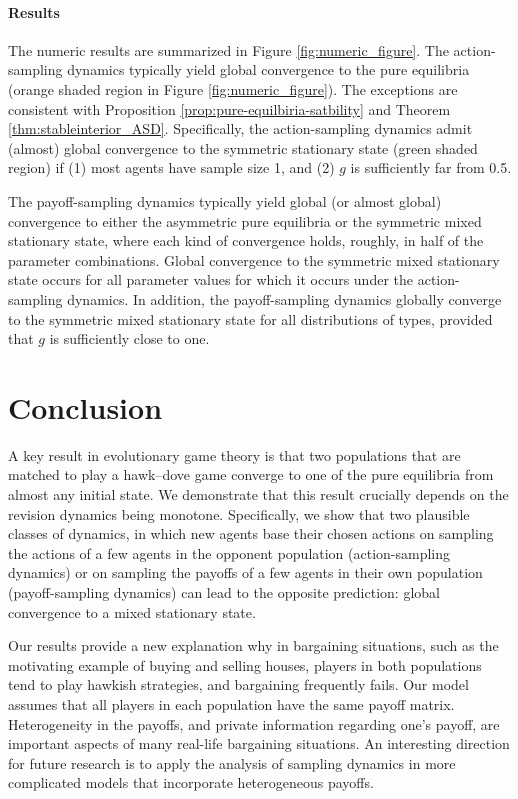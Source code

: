 \documentclass[12pt]{article}
\numberwithin{equation}{section}
\numberwithin{figure}{section}
\theoremstyle{definition}
\theoremstyle{plain}
\theoremstyle{plain}
\theoremstyle{plain}
\theoremstyle{remark}
\theoremstyle{plain}
\theoremstyle{plain}
\begin{document}
\paragraph{Results}
The numeric results are summarized in Figure
\ref{fig:numeric_figure}. 
The action-sampling dynamics typically yield global convergence to the pure equilibria  (orange shaded region in Figure
\ref{fig:numeric_figure}).  The exceptions are consistent with Proposition \ref{prop:pure-equilbiria-satbility} and Theorem \ref{thm:stableinterior_ASD}. Specifically, the action-sampling dynamics admit (almost) global convergence to the symmetric stationary state (green shaded region) if  (1) most agents have sample size 1, and (2) $g$ is sufficiently far from 0.5. 

The payoff-sampling dynamics typically yield global (or almost global) convergence to either the asymmetric pure equilibria  or the symmetric mixed stationary state, where each kind of convergence holds, roughly, in half of the parameter combinations. Global convergence to the symmetric mixed stationary state occurs for all parameter values for which it occurs under the action-sampling dynamics. In addition, the payoff-sampling dynamics globally converge to the symmetric mixed stationary state for all distributions of types, provided that $g$ is sufficiently close to one. 


\section{Conclusion}\label{sec:conclusion}
A key result in evolutionary game theory is that two populations that are matched to play a hawk--dove game converge to one of the pure equilibria from almost any initial state. We demonstrate that this result crucially depends on the revision dynamics being monotone. Specifically, we show that two plausible classes of  dynamics, in which new agents base their chosen actions on sampling the actions of a few agents in the opponent population (action-sampling dynamics) or on sampling the payoffs of a few agents in their own population (payoff-sampling dynamics) can lead to the opposite prediction: global convergence to a mixed stationary state. 


Our results provide a new explanation why in bargaining situations, such as the motivating example of buying and selling houses, players in both populations tend to play hawkish strategies, and bargaining frequently fails.
Our model assumes that all players in each population have the same payoff matrix. Heterogeneity in the payoffs, and private information regarding one's payoff, are important aspects of many real-life bargaining situations. An interesting direction for future research is to apply the analysis of sampling dynamics in more complicated models that incorporate heterogeneous payoffs.  
\end{document}
